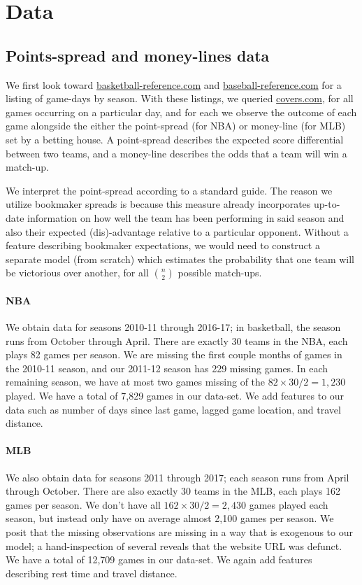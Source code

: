 \documentclass[letterpaper,12pt]{article}
\begin{document}
\section{Data}
\subsection{Points-spread and money-lines data} We first look toward 
\href{http://www.basketball-reference.com/leagues/}{basketball-reference.com} and
\href{http://www.baseball-reference.com/leagues/}{baseball-reference.com}
for a listing of game-days by season. With these listings, we queried \href{http://www.covers.com/sports/NBA/matchups?selectedDate=2011-1-01}{covers.com},
for all games occurring on a particular day, and for each we observe the
outcome of each game alongside the either the point-spread (for NBA) or money-line (for MLB) 
set by a betting house. A point-spread describes the expected score differential
between two teams, and a money-line describes the odds that a
team will win a match-up.

We interpret the point-spread according to a standard guide.\citep{hrisports} 
The reason we utilize bookmaker spreads is because this measure already incorporates
up-to-date information on how well the team has been performing in said season and also
their expected (dis)-advantage relative to a particular opponent. Without a feature
describing bookmaker expectations, we would need to construct a separate model (from scratch)
which estimates the probability that one team will be victorious over another, for all
$\binom{n}{2}$ possible match-ups.

\paragraph{NBA}
We obtain
data for seasons 2010-11 through 2016-17; in basketball, the season runs from October through April. 
There are exactly 30 teams in the NBA,
each plays 82 games per season.
We are missing the first couple months of games 
in the 2010-11 season, and our 2011-12 season has 229 missing games. In each remaining
season, we have at most two games missing of the $82 \times 30 / 2 = 1,230$ played.
We have a total of 7,829 games in our data-set. We add features
to our data such as number of days since last game, lagged game location, and 
travel distance.

\paragraph{MLB} We also obtain data for seasons 2011 through 2017; each season runs from 
April through October. There are also exactly 30 teams in the MLB, each plays 162 games per season.
We don't have all $162 \times 30 / 2 = 2,430$ games played each season, but instead only have
on average almost 2,100 games per season. We posit that the missing observations
are missing in a way that is exogenous to our model; a hand-inspection of several
reveals that the website URL was defunct.
We have a total of 12,709 games in our data-set. We again add features describing rest time and travel distance.
\end{document}
